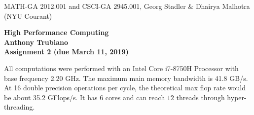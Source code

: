 \documentclass[11pt]{article}
\begin{document}
\begin{center}
  \vspace*{-2cm}
{\small MATH-GA 2012.001 and CSCI-GA 2945.001, Georg Stadler \&
  Dhairya Malhotra (NYU Courant)}
\end{center}
\vspace*{.5cm}
\begin{center}
\large \textbf{%
High Performance Computing \\
Anthony Trubiano \\
Assignment 2 (due March 11, 2019) }
\end{center}


 All computations were performed with an Intel Core i7-8750H Processor with base frequency 2.20 GHz. The maximum main memory bandwidth is 41.8 GB/s. At 16 double 
precision operations per cycle, the theoretical max flop rate would be about 35.2 GFlops/s. It has $6$ cores and can reach $12$ threads through hyper-threading. 
\end{document}
